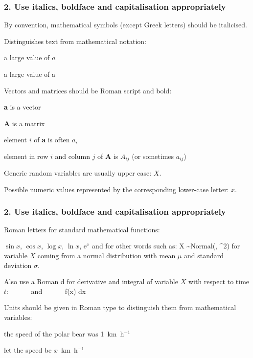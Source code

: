 

\begin{frame}
\frametitle{2. Use italics, boldface and capitalisation appropriately}

By convention, mathematical symbols (except Greek letters) should be italicised.

Distinguishes text from mathematical notation:

\bi
\item a large value of $a$
\item a large value of a
\ei

\pause

Vectors and matrices should be Roman script and bold:
\bi
\item {\bf a} is a vector
\item {\bf A} is a matrix
\item element $i$ of {\bf a} is often $a_i$
\item element in row $i$ and column $j$ of {\bf A} is  $A_{ij}$ (or sometimes
  $a_{ij}$)
\ei


Generic random variables are usually upper case:  $X$.

Possible numeric values represented by the corresponding lower-case letter: $x$.
\end{frame}



\begin{frame}
\frametitle{2. Use italics, boldface and capitalisation appropriately}

Roman letters for standard mathematical functions:
\bi
\item $\sin x$, $\cos x$, $\log x$, $\ln x$, e$^x$
\ei
and for other words such as:
\eb
\nonumber X \sim \mbox{Normal}(\mu, \sigma^2)
\label{Xnormal}
\ee
\pause
for variable $X$ coming from a normal distribution with mean $\mu$ and
standard deviation $\sigma$.
\pause

\medskip
Also use a Roman d for derivative and integral of variable $X$ with respect to time $t$:
\eb
\nonumber {} ~~~~~~\mbox{and}~~~~~~ \int f(x) \mbox{d}x
\ee

\pause
\medskip

Units should be given in Roman type to distinguish them from mathematical variables:
\bi
\item the speed of the polar bear was 1~km~h$^{-1}$
\item let the speed be $x$~km~h$^{-1}$
\ei

\end{frame}

